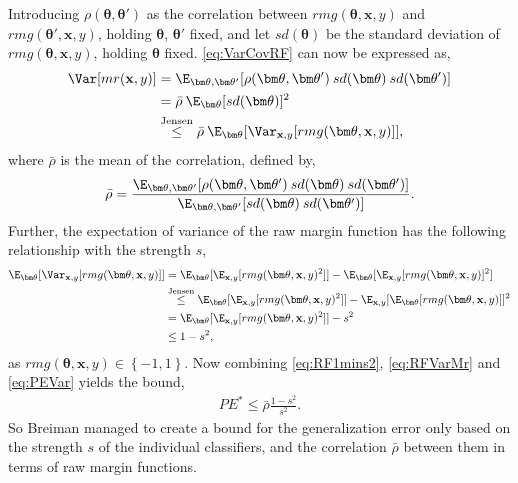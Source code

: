 Introducing $\rho(\bm \theta, \bm \theta')$ as the correlation between $rmg(\bm \theta, \mathbf{x}, y)$ and $rmg(\bm \theta', \mathbf{x}, y)$, holding $\bm \theta$, $\bm \theta'$ fixed, and let $sd(\bm \theta)$ be the standard deviation of $rmg(\bm \theta, \mathbf{x}, y)$, holding $\bm \theta$ fixed. \eqref{eq:VarCovRF} can now be expressed as,
\begin{align}
  \Var[mr(\mathbf{x}, y)] 
  &= \E_{\bm \theta, \bm \theta'}[\rho(\bm \theta, \bm \theta') \: sd(\bm \theta) \: sd(\bm \theta')] \notag \\
  &= \bar \rho \: \E_{\bm \theta}[sd(\bm \theta)]^2 \notag \\
  \label{eq:RFVarMr} 
  &\overset{\text{Jensen}}{\leq}  \bar \rho \: \E_{\bm \theta}[\Var_{\mathbf{x}, y}[rmg(\bm \theta, \mathbf{x}, y)]],
\end{align}
where $\bar \rho$ is the mean of the correlation, defined by,
\begin{align}
  \bar \rho = 
  \frac{\E_{\bm \theta, \bm \theta'}[\rho(\bm \theta, \bm \theta') \: sd(\bm \theta) \: sd(\bm \theta')]}
  {\E_{\bm \theta, \bm \theta'}[sd(\bm \theta) \: sd(\bm \theta')]}.
\end{align}
Further, the expectation of variance of the raw margin function has the following relationship with the strength $s$,
\begin{align}
  \E_{\bm \theta}[\Var_{\mathbf{x}, y}[rmg(\bm \theta, \mathbf{x}, y)]] 
  &= \E_{\bm \theta}[\E_{\mathbf{x}, y}[rmg(\bm \theta, \mathbf{x}, y)^2]] - \E_{\bm \theta}[\E_{\mathbf{x}, y}[rmg(\bm \theta, \mathbf{x}, y)]^2] \notag \\
  &\overset{\text{Jensen}}{\leq}
  \E_{\bm \theta}[\E_{\mathbf{x}, y}[rmg(\bm \theta, \mathbf{x}, y)^2]] - \E_{\mathbf{x}, y}[\E_{\bm \theta}[rmg(\bm \theta, \mathbf{x}, y)]]^2 \notag \\
  &= \E_{\bm \theta}[\E_{\mathbf{x}, y}[rmg(\bm \theta, \mathbf{x}, y)^2]] - s^2 \notag \\
  \label{eq:RF1mins2} 
  &\leq 1 - s^2,
\end{align}
as $rmg(\bm \theta, \mathbf{x}, y) \in \left\{ -1, 1 \right\}$. Now combining \eqref{eq:RF1mins2}, \eqref{eq:RFVarMr} and \eqref{eq:PEVar} yields the bound,
\begin{align}
  PE^* \leq \bar \rho  \frac{1 - s^2}{s^2} .
\end{align}
So Breiman managed to create a bound for the generalization error only based on the strength $s$ of the individual classifiers, and the correlation $\bar \rho$ between them in terms of raw margin functions. 

